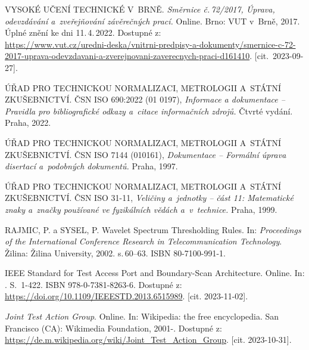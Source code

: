 

\begin{thebibliography}{99}
	
	VYSOKÉ UČENÍ TECHNICKÉ V~BRNĚ.
	\emph{Směrnice č.\,72/2017, Úprava, odevzdávání a~zveřejňování závěrečných prací.}
	Online. Brno: VUT v~Brně, 2017.
	Úplné znění ke dni 11.\,4.\,2022.
	Dostupné z:\\
	{\small
	\url{https://www.vut.cz/uredni-deska/vnitrni-predpisy-a-dokumenty/smernice-c-72-2017-uprava-odevzdavani-a-zverejnovani-zaverecnych-praci-d161410}.}
	[cit.\ 2023-09-27].

    ÚŘAD PRO TECHNICKOU NORMALIZACI, METROLOGII A~STÁTNÍ ZKUŠEBNICTVÍ.
    ČSN ISO 690:2022 (01 0197), \emph{Informace a dokumentace -- Pravidla pro bibliografické odkazy a~citace informačních zdrojů.}
    Čtvrté vydání. Praha, 2022.

    ÚŘAD PRO TECHNICKOU NORMALIZACI, METROLOGII A~STÁTNÍ ZKUŠEBNICTVÍ.
    ČSN ISO 7144 (010161), \emph{Dokumentace -- Formální úprava disertací a~podobných dokumentů.}
    Praha, 1997.

    ÚŘAD PRO TECHNICKOU NORMALIZACI, METROLOGII A~STÁTNÍ ZKUŠEBNICTVÍ.
    ČSN ISO 31-11, \emph{Veličiny a~jednotky -- část 11: Matematické znaky a~značky používané ve fyzikálních vědách a~v~technice.}
    Praha, 1999.

    RAJMIC, P. a SYSEL, P.
    Wavelet Spectrum Thresholding Rules.
    In: \emph{Proceedings of the International Conference Research in Telecommunication Technology}.
    Žilina: Žilina University, 2002. s.\,60--63. ISBN 80-7100-991-1.

IEEE Standard for Test Access Port and Boundary-Scan Architecture. Online. In: . S.~1-422. ISBN 978-0-7381-8263-6. Dostupné z: \url{https://doi.org/10.1109/IEEESTD.2013.6515989}. [cit. 2023-11-02].

\textit{Joint Test Action Group}. Online. In: Wikipedia: the free encyclopedia. San Francisco (CA): Wikimedia Foundation, 2001-. Dostupné z: \url{https://de.m.wikipedia.org/wiki/Joint\_Test\_Action\_Group}. [cit. 2023-10-31].


\end{thebibliography}
